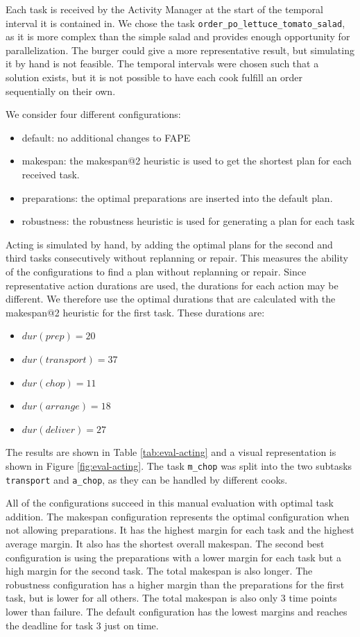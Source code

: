 Each task is received by the Activity Manager at the start of the temporal interval it is contained in.
We chose the task \verb|order_po_lettuce_tomato_salad|, as it is more complex than the simple salad and provides enough opportunity for parallelization.
The burger could give a more representative result, but simulating it by hand is not feasible.
The temporal intervals were chosen such that a solution exists, but it is not possible to have each cook fulfill an order sequentially on their own.

We consider four different configurations:
\begin{itemize}
  \item default: no additional changes to FAPE
  \item makespan: the makespan@2 heuristic is used to get the shortest plan for each received task.
  \item preparations: the optimal preparations are inserted into the default plan.
  \item robustness: the robustness heuristic is used for generating a plan for each task
\end{itemize}

Acting is simulated by hand, by adding the optimal plans for the second and third tasks consecutively without replanning or repair.
This measures the ability of the configurations to find a plan without replanning or repair.
Since representative action durations are used, the durations for each action may be different.
We therefore use the optimal durations that are calculated with the makespan@2 heuristic for the first task.
These durations are: 
\begin{itemize}
  \item $dur(prep)=20$
  \item $dur(transport)=37$
  \item $dur(chop)=11$
  \item $dur(arrange)=18$
  \item $dur(deliver)=27$
\end{itemize}

The results are shown in Table \ref{tab:eval-acting} and a visual representation is shown in Figure \ref{fig:eval-acting}.
The task \verb|m_chop| was split into the two subtasks \verb|transport| and \verb|a_chop|, as they can be handled by different cooks. 

All of the configurations succeed in this manual evaluation with optimal task addition.
The makespan configuration represents the optimal configuration when not allowing preparations.
It has the highest margin for each task and the highest average margin.
It also has the shortest overall makespan.
The second best configuration is using the preparations with a lower margin for each task but a high margin for the second task.
The total makespan is also longer.
The robustness configuration has a higher margin than the preparations for the first task, but is lower for all others.
The total makespan is also only 3 time points lower than failure.
The default configuration has the lowest margins and reaches the deadline for task 3 just on time.


